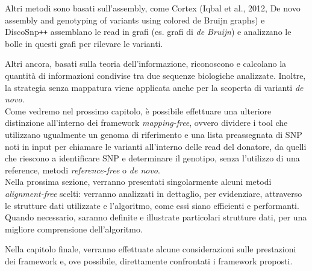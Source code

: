 \documentclass[../main.tex]{subfiles}
\begin{document}
Altri metodi sono basati sull'assembly, come Cortex (Iqbal et al., 2012, De novo assembly and genotyping of variants using colored de Bruijn graphs) e DiscoSnp\texttt{++} \cite{peterlongo2017discosnp++} assemblano le read in grafi (es. grafi di \textit{de Bruijn}) e analizzano le bolle in questi grafi per rilevare le varianti. 

Altri ancora, basati sulla teoria dell'informazione, riconoscono e calcolano la quantità di informazioni condivise tra due sequenze biologiche analizzate. Inoltre, la strategia senza mappatura viene applicata anche per la scoperta di varianti \textit{de novo}.\\


\noindent
Come vedremo nel prossimo capitolo, è possibile effettuare una ulteriore distinzione all'interno dei framework \textit{mapping-free}, ovvero dividere i tool che utilizzano ugualmente un genoma di riferimento e una lista preassegnata di SNP noti in input per chiamare le varianti all'interno delle read del donatore, da quelli che riescono a identificare SNP e determinare il genotipo, senza l'utilizzo di una reference, metodi \textit{reference-free} o \textit{de novo}.\\




\noindent
Nella prossima sezione, verranno presentati singolarmente alcuni metodi \textit{alignment-free} scelti: verranno analizzati in dettaglio, per evidenziare, attraverso le strutture dati utilizzate e l'algoritmo, come essi siano efficienti e performanti. Quando necessario, saranno definite e illustrate particolari strutture dati, per una migliore comprensione dell'algoritmo.

Nella capitolo finale, verranno effettuate alcune considerazioni sulle prestazioni dei framework e, ove possibile, direttamente confrontati i framework proposti.


\end{document}
